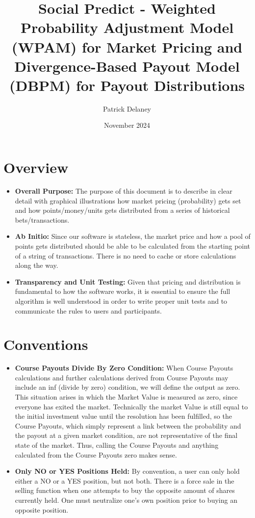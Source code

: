 \documentclass{article}
\title{Social Predict - Weighted Probability Adjustment Model (WPAM) for Market Pricing and Divergence-Based Payout Model (DBPM) for Payout Distributions}
\author{Patrick Delaney}
\date{November 2024}
\begin{document}
\maketitle

\section{Overview}

\begin{itemize}
    \item \textbf{Overall Purpose:} The purpose of this document is to describe in clear detail with graphical illustrations how market pricing (probability) gets set and how points/money/units gets distributed from a series of historical bets/transactions.
    \item \textbf{Ab Initio:} Since our software is stateless, the market price and how a pool of points gets distributed should be able to be calculated from the starting point of a string of transactions. There is no need to cache or store calculations along the way.
    \item \textbf{Transparency and Unit Testing:} Given that pricing and distribution is fundamental to how the software works, it is essential to ensure the full algorithm is well understood in order to write proper unit tests and to communicate the rules to users and participants.
\end{itemize}

\section{Conventions}

\begin{itemize}
    \item \textbf{Course Payouts Divide By Zero Condition:} When Course Payouts calculations and further calculations derived from Course Payouts may include an inf (divide by zero) condition, we will define the output as zero. This situation arises in which the Market Value is measured as zero, since everyone has exited the market. Technically the market Value is still equal to the initial investment value until the resolution has been fulfilled, so the Course Payouts, which simply represent a link between the probability and the payout at a given market condition, are not representative of the final state of the market. Thus, calling the Course Payouts and anything calculated from the Course Payouts zero makes sense.
    \item \textbf{Only NO or YES Positions Held:} By convention, a user can only hold either a NO or a YES position, but not both. There is a force sale in the selling function when one attempts to buy the opposite amount of shares currently held. One must neutralize one's own position prior to buying an opposite position.
\end{itemize}
\end{document}

